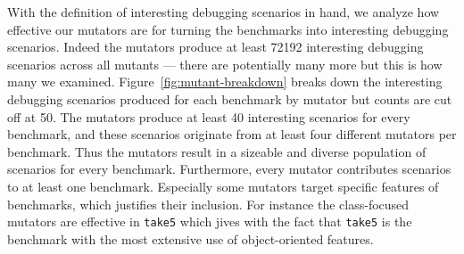 With the definition of interesting debugging scenarios in hand, we analyze how effective our mutators
are for turning the benchmarks into interesting debugging scenarios.
Indeed the mutators produce at least 72192 interesting debugging scenarios
across all mutants --- there are potentially many more but this is how
many we examined. 
Figure~\ref{fig:mutant-breakdown} breaks down the interesting
debugging scenarios produced  for each benchmark by mutator 
but counts are cut off at 50. The mutators produce at least 40 interesting
scenarios for every benchmark, and these scenarios originate from at
least four different mutators per benchmark.  Thus the mutators result in 
a sizeable and diverse population of scenarios for every benchmark.
Furthermore, every mutator contributes scenarios to at least one
benchmark. Especially some mutators  target specific features of
benchmarks, which
justifies their inclusion. For
instance the class-focused mutators are effective in \texttt{take5}
which jives with the fact that \texttt{take5} is the benchmark with 
the most extensive use of object-oriented features.
